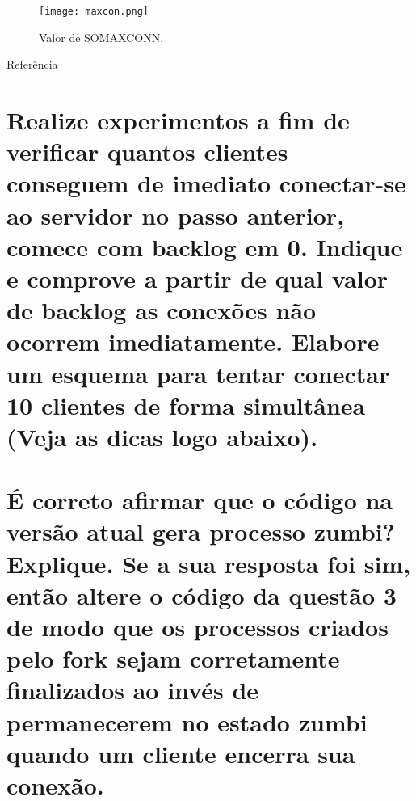 \documentclass[12pt,a4paper]{report}
\begin{document}
\begin{figure}[H]
  \texttt{[image: maxcon.png]}
  \caption{Valor de SOMAXCONN.}
\end{figure}

\href{http://veithen.io/2014/01/01/how-tcp-backlog-works-in-linux.html}{Referência}

\section{Realize experimentos a fim de verificar quantos clientes conseguem de imediato
conectar-se ao servidor no passo anterior, comece com backlog em 0. Indique e
comprove a partir de qual valor de backlog as conexões não ocorrem imediatamente.
Elabore um esquema para tentar conectar 10 clientes de forma simultânea (Veja as
dicas logo abaixo).}

\section{É correto afirmar que o código na versão atual gera processo zumbi? Explique. Se a
sua resposta foi sim, então altere o código da questão 3 de modo que os processos
criados pelo fork sejam corretamente finalizados ao invés de permanecerem no estado
zumbi quando um cliente encerra sua conexão.}


\end{document}

